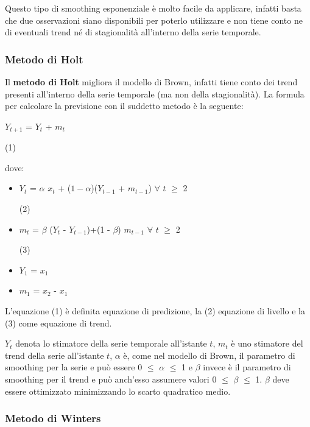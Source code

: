 \documentclass[12pt,a4paper,oneside,openright]{book}
\begin{document}
Questo tipo di smoothing esponenziale è molto facile da applicare, infatti basta che due osservazioni siano disponibili per poterlo utilizzare e non tiene conto ne di eventuali trend né di stagionalità all'interno della serie temporale.
\subsubsection{Metodo di Holt}
Il {\bfseries metodo di Holt} migliora il modello di Brown, infatti tiene conto dei trend presenti all'interno della serie temporale (ma non della stagionalità). La formula per calcolare la previsione con il suddetto metodo è la seguente:

 \begin{center} 
$Y_{t+1}$ = $Y_{t}$ + $m_{t}$  
\end{center} 
\begin{flushright}
(1)
\end{flushright}

dove: 
\begin{itemize}

\item $Y_{t}$ = $\alpha$ $x_{t}$ + (${1 - \alpha }$)($Y_{t-1}$ + $m_{t-1}$) $\forall$ $t$ $\geq$ 2 
\begin{flushright}
(2)
\end{flushright}
\item $m_{t}$ = $\beta$ ($Y_{t}$ - $Y_{t-1}$)+(1 - $\beta$) $m_{t-1}$ $\forall$ $t$ $\geq$ 2 
\begin{flushright}
(3)
\end{flushright}
\item $Y_{1}$ = $x_{1}$

\item $m_{1}$ = $x_{2}$ - $x_{1}$
\end{itemize}


L'equazione (1) è definita equazione di predizione, la (2) equazione di livello e la (3) come equazione di trend. 

$Y_{t}$ denota lo stimatore della serie temporale all'istante $t$, $m_{t}$ è uno stimatore del trend della serie all'istante $t$, $\alpha$ è, come nel modello di Brown, il parametro di smoothing per la serie e può essere 0 $\leq$ $\alpha$ $\leq$ 1 e $\beta$ invece è il parametro di smoothing per il trend e può anch'esso assumere valori 0 $\leq$ $\beta$ $\leq$ 1. 
$\beta$ deve essere ottimizzato minimizzando lo scarto quadratico medio.

\subsubsection{Metodo di Winters}
\end{document}

